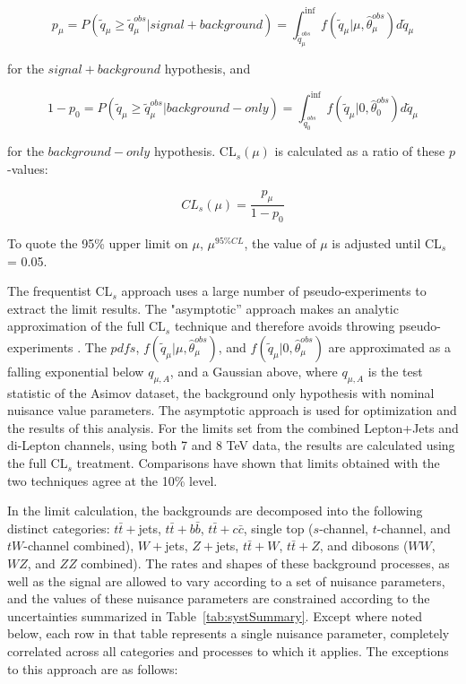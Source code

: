 \begin{equation}
p_{\mu} = P( \tilde{q}_{\mu} \ge \tilde{q}_{\mu}^{obs} | signal +
background ) = \int_{\tilde{q}_{\mu}^{obs}}^{\inf} f(\tilde{q}_{\mu}|\mu,
\hat{\theta}_{\mu}^{obs}) d\tilde{q}_{\mu} 
\end{equation}

\noindent for the $signal+background$ hypothesis, and 

\begin{equation}
1 - p_{0} = P( \tilde{q}_{\mu} \ge \tilde{q}_{\mu}^{obs} |
background-only ) = \int_{\tilde{q}_{0}^{obs}}^{\inf}
f(\tilde{q}_{\mu}|0,\hat{\theta}_{0}^{obs}) d\tilde{q}_{\mu} 
\end{equation}

\noindent for the $background-only$ hypothesis.  CL$_{s}(\mu)$ is
calculated as a ratio of these $p$-values:

\begin{equation}
CL_{s}(\mu) = \frac{p_{\mu}}{1-p_{0}}
\end{equation}

\noindent To quote the 95\% upper limit on $\mu$, $\mu^{95\%CL}$, the
value of $\mu$ is adjusted until CL$_{s}$ = 0.05. 

\par The frequentist CL$_s$ approach uses a large number of
pseudo-experiments to extract the limit results.  The "asymptotic''
approach makes an analytic approximation of the full CL$_s$ technique
and therefore avoids throwing pseudo-experiments \cite{Cowan:2010js}.
The $pdfs$, $f(\tilde{q}_{\mu}|\mu,
\hat{\theta}_{\mu}^{obs})$, and $f(\tilde{q}_{\mu}|0,
\hat{\theta}_{\mu}^{obs})$ are approximated as a falling exponential
below $q_{\mu,A}$, and a Gaussian above, where $q_{\mu,A}$ is the test
statistic of the Asimov dataset, the background only hypothesis with
nominal nuisance value parameters.  The asymptotic approach is used
for optimization and the results of this analysis.  For the limits set
from the combined Lepton+Jets and di-Lepton channels, using both 7 and
8 TeV data, the results are calculated using the full CL$_s$
treatment. Comparisons have shown that limits obtained with the two
techniques agree at the 10\% level.  

\par In the limit calculation, the backgrounds are decomposed into the
following distinct categories: $t\bar{t}+$jets, $t\bar{t}+b\bar{b}$,
$t\bar{t}+c\bar{c}$, single top ($s$-channel, $t$-channel, and
$tW$-channel combined), $W+$jets, $Z+$jets, $t\bar{t}+W$,
$t\bar{t}+Z$, and dibosons ($WW$, $WZ$, and $ZZ$ combined).  The rates
and shapes of these background processes, as well as the signal are
allowed to vary according to a set of nuisance parameters, and the
values of these nuisance parameters are constrained according to the
uncertainties summarized in Table~\ref{tab:systSummary}.  Except where
noted below, each row in that table represents a single nuisance
parameter, completely correlated across all categories and processes
to which it applies.  The exceptions to this approach are as follows: 

